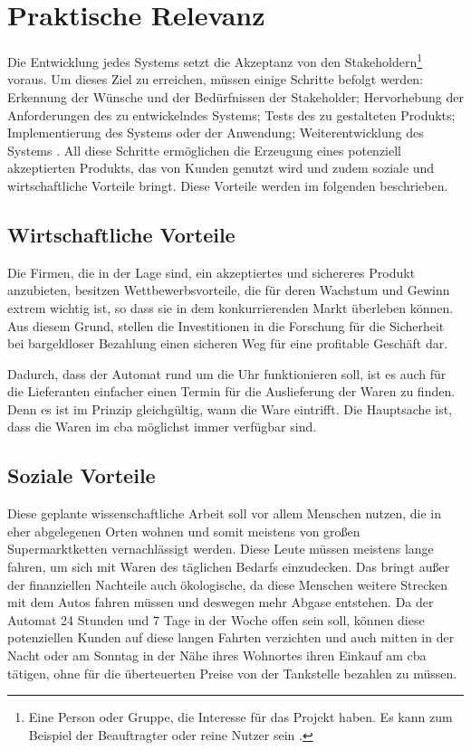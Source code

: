 \section{Praktische Relevanz}

Die Entwicklung jedes Systems setzt die Akzeptanz von den Stakeholdern\footnote{Eine Person oder Gruppe, die Interesse 
für das Projekt haben. Es kann zum Beispiel der Beauftragter oder reine Nutzer sein \cite{refip:HSSI}.} voraus. Um dieses Ziel 
zu erreichen, müssen einige Schritte befolgt werden: Erkennung der Wünsche und der Bedürfnissen der Stakeholder; Hervorhebung 
der Anforderungen des zu entwickelndes Systems; Tests des zu gestalteten Produkts; Implementierung des Systems oder 
der Anwendung; Weiterentwicklung des Systems \cite{refbook:RECR}. All diese Schritte ermöglichen die Erzeugung eines 
potenziell akzeptierten Produkts, das von Kunden genutzt wird und zudem soziale und wirtschaftliche Vorteile bringt.
Diese Vorteile werden im folgenden beschrieben.


\subsection{Wirtschaftliche Vorteile}

Die Firmen, die in der Lage sind, ein akzeptiertes und sichereres Produkt anzubieten, besitzen Wettbewerbsvorteile, 
die für deren Wachstum und Gewinn extrem wichtig ist, so dass sie in dem konkurrierenden Markt überleben können. Aus 
diesem Grund, stellen die Investitionen in die Forschung für die Sicherheit bei bargeldloser Bezahlung einen sicheren 
Weg für eine profitable Geschäft dar.


Dadurch, dass der Automat rund um die Uhr funktionieren soll, ist es auch für die Lieferanten einfacher einen Termin 
für die Auslieferung der Waren zu finden. Denn es ist im Prinzip gleichgültig, wann die Ware eintrifft. Die Hauptsache 
ist, dass die Waren im \acrshort{cba} möglichst immer verfügbar sind. 


\subsection{Soziale Vorteile}

Diese geplante wissenschaftliche Arbeit soll vor allem Menschen nutzen, die in eher abgelegenen Orten wohnen und somit 
meistens von großen Supermarktketten vernachlässigt werden. Diese Leute müssen meistens lange fahren, um sich mit
Waren des täglichen Bedarfs einzudecken. Das bringt außer der finanziellen Nachteile auch ökologische, da diese Menschen 
weitere Strecken mit dem Autos fahren müssen und deswegen mehr Abgase entstehen. Da der Automat 24 Stunden und 7 Tage 
in der Woche offen sein soll, können diese potenziellen Kunden auf diese langen Fahrten verzichten und auch mitten in 
der Nacht oder am Sonntag in der Nähe ihres Wohnortes ihren Einkauf am \acrshort{cba} tätigen, ohne für die überteuerten
Preise von der Tankstelle bezahlen zu müssen. 

